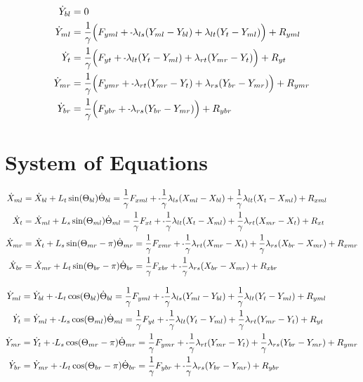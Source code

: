 \documentclass[11pt, landscape]{article}
\newcommand{\mn}{\scalebox{0.7}[1.0]{-}}
\begin{document}
\begin{align}  
  \dot{Y}_{bl} &= 0 \\
  \dot{Y}_{ml} &= \frac{1}{\gamma} \Big(F_{yml} + \mn \lambda_{ls}(Y_{ml} - Y_{bl}) + \lambda_{lt}(Y_{t } - Y_{ml}) \Big) + R_{yml} \\
  \dot{Y}_{t}  &= \frac{1}{\gamma} \Big(F_{yt } + \mn \lambda_{lt}(Y_{t } - Y_{ml}) + \lambda_{rt}(Y_{mr} - Y_{t }) \Big) + R_{yt } \\
  \dot{Y}_{mr} &= \frac{1}{\gamma} \Big(F_{ymr} + \mn \lambda_{rt}(Y_{mr} - Y_{t }) + \lambda_{rs}(Y_{br} - Y_{mr}) \Big) + R_{ymr} \\
  \dot{Y}_{br} &= \frac{1}{\gamma} \Big(F_{ybr} + \mn \lambda_{rs}(Y_{br} - Y_{mr})                                 \Big) + R_{ybr}
\end{align}
  
  \section{System of Equations}

\begin{align}  
  \dot{X}_{ml} &= \dot{X}_{bl} + L_{t}\sin(\Theta_{bl})      \dot{\Theta}_{bl} = \frac{1}{\gamma}F_{xml} + \mn\frac{1}{\gamma}\lambda_{ls}(X_{ml} - X_{bl}) + \frac{1}{\gamma}\lambda_{lt}(X_{t } - X_{ml}) + R_{xml} \\
  \dot{X}_{t}  &= \dot{X}_{ml} + L_{s}\sin(\Theta_{ml})      \dot{\Theta}_{ml} = \frac{1}{\gamma}F_{xt } + \mn\frac{1}{\gamma}\lambda_{lt}(X_{t } - X_{ml}) + \frac{1}{\gamma}\lambda_{rt}(X_{mr} - X_{t }) + R_{xt } \\
  \dot{X}_{mr} &= \dot{X}_{t } + L_{s}\sin(\Theta_{mr}-\pi)  \dot{\Theta}_{mr} = \frac{1}{\gamma}F_{xmr} + \mn\frac{1}{\gamma}\lambda_{rt}(X_{mr} - X_{t }) + \frac{1}{\gamma}\lambda_{rs}(X_{br} - X_{mr}) + R_{xmr} \\
  \dot{X}_{br} &= \dot{X}_{mr} + L_{t}\sin(\Theta_{br}-\pi)  \dot{\Theta}_{br} = \frac{1}{\gamma}F_{xbr} + \mn\frac{1}{\gamma}\lambda_{rs}(X_{br} - X_{mr}) + R_{xbr}
\end{align}

\begin{align}  
  \dot{Y}_{ml} &= \dot{Y}_{bl} + \mn L_{t}\cos(\Theta_{bl})      \dot{\Theta}_{bl} = \frac{1}{\gamma}F_{yml} + \mn\frac{1}{\gamma}\lambda_{ls}(Y_{ml} - Y_{bl}) + \frac{1}{\gamma}\lambda_{lt}(Y_{t } - Y_{ml}) + R_{yml} \\
  \dot{Y}_{t}  &= \dot{Y}_{ml} + \mn L_{s}\cos(\Theta_{ml})      \dot{\Theta}_{ml} = \frac{1}{\gamma}F_{yt } + \mn\frac{1}{\gamma}\lambda_{lt}(Y_{t } - Y_{ml}) + \frac{1}{\gamma}\lambda_{rt}(Y_{mr} - Y_{t }) + R_{yt } \\
  \dot{Y}_{mr} &= \dot{Y}_{t } + \mn L_{s}\cos(\Theta_{mr}-\pi)  \dot{\Theta}_{mr} = \frac{1}{\gamma}F_{ymr} + \mn\frac{1}{\gamma}\lambda_{rt}(Y_{mr} - Y_{t }) + \frac{1}{\gamma}\lambda_{rs}(Y_{br} - Y_{mr}) + R_{ymr} \\
  \dot{Y}_{br} &= \dot{Y}_{mr} + \mn L_{t}\cos(\Theta_{br}-\pi)  \dot{\Theta}_{br} = \frac{1}{\gamma}F_{ybr} + \mn\frac{1}{\gamma}\lambda_{rs}(Y_{br} - Y_{mr}) + R_{ybr}
\end{align}
\end{document}
